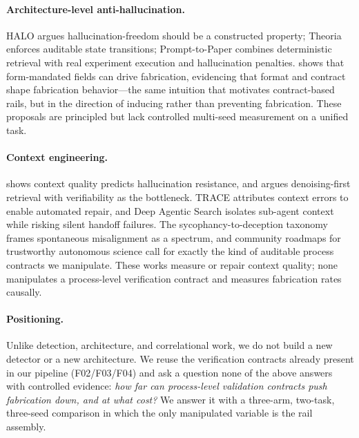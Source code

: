 \documentclass[10pt,twocolumn]{article}
\begin{document}
\paragraph{Architecture-level anti-hallucination.}
HALO \citep{raduta2026halo} argues hallucination-freedom should be a constructed property; Theoria \citep{saldivar2026theoria} enforces auditable state transitions; Prompt-to-Paper \citep{kamran2026prompttopaper} combines deterministic retrieval with real experiment execution and hallucination penalties. \citet{usman2026phantomfill} shows that form-mandated fields can drive fabrication, evidencing that format and contract shape fabrication behavior---the same intuition that motivates contract-based rails, but in the direction of inducing rather than preventing fabrication. These proposals are principled but lack controlled multi-seed measurement on a unified task.

\paragraph{Context engineering.}
\citet{bousetouane2026context} shows context quality predicts hallucination resistance, and \citet{dai2026llmorir} argues denoising-first retrieval with verifiability as the bottleneck. TRACE \citep{zhao2026trace} attributes context errors to enable automated repair, and Deep Agentic Search \citep{rafieioskooei2026deepagentic} isolates sub-agent context while risking silent handoff failures. The sycophancy-to-deception taxonomy \citep{shi2026sycophancy} frames spontaneous misalignment as a spectrum, and community roadmaps for trustworthy autonomous science \citep{ferreiradasilva2026trustworthy} call for exactly the kind of auditable process contracts we manipulate. These works measure or repair context quality; none manipulates a process-level verification contract and measures fabrication rates causally.

\paragraph{Positioning.}
Unlike detection, architecture, and correlational work, we do not build a new detector or a new architecture. We reuse the verification contracts already present in our pipeline (F02/F03/F04) and ask a question none of the above answers with controlled evidence: \emph{how far can process-level validation contracts push fabrication down, and at what cost?} We answer it with a three-arm, two-task, three-seed comparison in which the only manipulated variable is the rail assembly.
\end{document}
